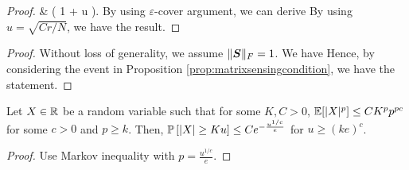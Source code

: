\begin{proof}
{    & \exp \Big(   { 1 +  u   } \Big).
    }
    By using $\varepsilon$-cover argument, we can derive
    By using $u = \sqrt{C r / N}$, we have the result.
\end{proof}


\begin{proof}
Without loss of generality, we assume $\lVert \boldsymbol{S} \rVert_F = 1$. We have
 Hence, by considering the event in Proposition \ref{prop:matrixsensingcondition}, we have the statement.
\end{proof}

\begin{proposition}
\label{prop:basicconcentration}
Let $X \in \mathbb{R}$ be a random variable such that for some $K,C > 0$, $\mathbb{E}[ \lvert X\rvert^p ] \leq C K^p p^{p c}$ for some $c > 0$ and $p \geq k$. Then, 
$\mathbb{P} \left[ \lvert X\rvert \geq K u  \right] \leq C e^{- \frac{u^{1/c}}{e}}$ for $u \geq (k e)^{c}$.
\end{proposition}

\begin{proof}
Use Markov inequality with $p = \tfrac{u^{1/c}}{e}$.
\end{proof}




  




